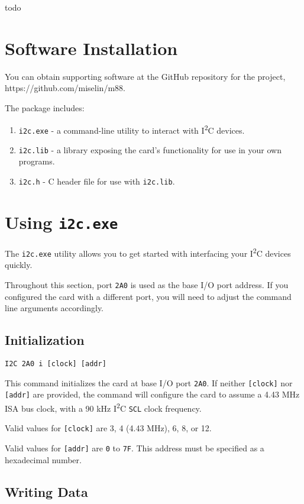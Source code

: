 \documentclass[twoside,10pt,letterpaper]{refart}
\newcommand{\itwoc}{I\textsuperscript{2}C}
\begin{document}
todo

\section*{Software Installation}

You can obtain supporting software at the GitHub repository for the  project, https://github.com/miselin/m88.

The package includes:

\begin{enumerate}
    \item \texttt{i2c.exe} - a command-line utility to interact with \itwoc{} devices.
    \item \texttt{i2c.lib} - a library exposing the card's functionality for use in your own programs.
    \item \texttt{i2c.h} - C header file for use with \texttt{i2c.lib}.
\end{enumerate}

\section*{Using \texttt{i2c.exe}}

The \texttt{i2c.exe} utility allows you to get started with interfacing your \itwoc{} devices quickly.

Throughout this section, port \texttt{2A0} is used as the base I/O port address. If you configured the card with a different
port, you will need to adjust the command line arguments accordingly.

\subsection*{Initialization}

\texttt{I2C 2A0 i [clock] [addr]}

This command initializes the card at base I/O port \texttt{2A0}. If neither \texttt{[clock]} nor \texttt{[addr]} are provided,
the command will configure the card to assume a 4.43 MHz ISA bus clock, with a 90 kHz \itwoc{} \texttt{SCL} clock frequency.

Valid values for \texttt{[clock]} are 3, 4 (4.43 MHz), 6, 8, or 12.

Valid values for \texttt{[addr]} are \texttt{0} to \texttt{7F}. This address must be specified as a hexadecimal number.

\subsection*{Writing Data}
\end{document}
